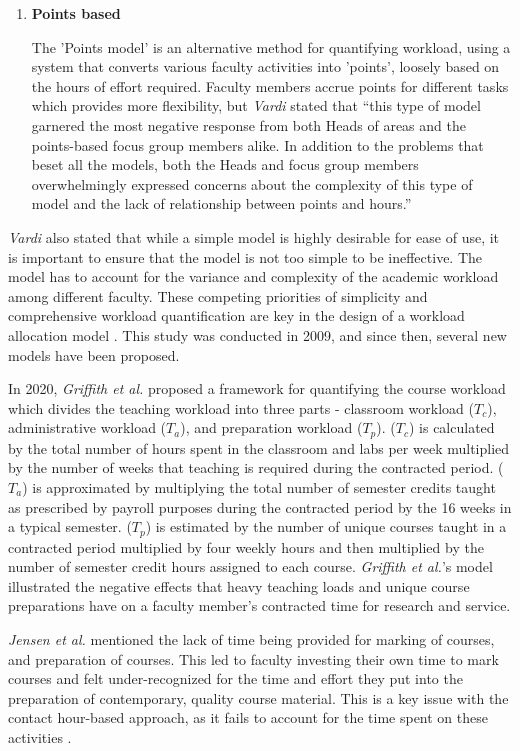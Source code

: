 \begin{enumerate}
  \item \textbf{Points based}

        The 'Points model' is an alternative method for quantifying workload, using a system that converts various faculty activities into 'points', loosely based on the hours of effort required. Faculty members accrue points for different tasks which provides more flexibility, but \textit{Vardi} stated that ``this type of model garnered the most negative response from both Heads of areas and the points-based focus group members alike. In addition to the problems that beset all the models, both the Heads and focus group members overwhelmingly expressed concerns about the complexity of this type of model and the lack of relationship between points and hours.'' \cite{vardi2009impacts}
\end{enumerate}


\textit{Vardi} also stated that while a simple model is highly desirable for ease of use, it is important to ensure that the model is not too simple to be ineffective. The model has to account for the variance and complexity of the academic workload among different faculty. These competing priorities of simplicity and comprehensive workload quantification are key in the design of a workload allocation model \cite{vardi2009impacts}. This study was conducted in 2009, and since then, several new models have been proposed.

In 2020, \textit{Griffith et al.} \cite{griffith2020framework} proposed a framework for quantifying the course workload which divides the teaching workload into three parts - classroom workload ($T_c$), administrative workload ($T_a$), and preparation workload ($T_p$). ($T_c$) is calculated by the total number of hours spent in the classroom and labs per week multiplied by the number of weeks that teaching is required during the contracted period. ($T_a$) is approximated by multiplying the total number of semester credits taught as prescribed by payroll purposes during the contracted period by the 16 weeks in a typical semester. ($T_p$) is estimated by the number of unique courses taught in a contracted period multiplied by four weekly hours and then multiplied by the number of semester credit hours assigned to each course. \textit{Griffith et al.}'s model illustrated the negative effects that heavy teaching loads and unique course preparations have on a faculty member's contracted time for research and service.

\textit{Jensen et al.} mentioned the lack of time being provided for marking of courses, and preparation of courses. This led to faculty investing their own time to mark courses and felt under-recognized for the time and effort they put into the preparation of contemporary, quality course material. This is a key issue with the contact hour-based approach, as it fails to account for the time spent on these activities \cite{jensen2009vanishing}.

